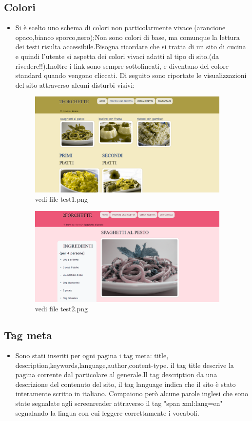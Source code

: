 \documentclass[12pt]{article}
\begin{document}
			\subsection{Colori}
			\begin{itemize}
				\item Si è scelto uno schema di colori non particolarmente vivace (arancione opaco,bianco sporco,nero);Non sono colori di base, ma comunque la lettura dei testi risulta accessibile.Bisogna ricordare che si tratta di un sito di cucina e quindi l'utente si aspetta dei colori vivaci adatti al tipo di sito.(da rivedere!!).Inoltre i link sono sempre sottolineati, e diventano del colore standard quando vengono cliccati.
				Di seguito sono riportate le visualizzazioni del sito attraverso alcuni disturbi visivi:
				
			
			\begin{figure}[ht!]
				\centering
				\includegraphics[width=100mm]{test1}
				\caption{vedi file test1.png}
			\end{figure}

				\begin{figure}[ht!]
					\centering
					\includegraphics[width=100mm]{test2}
					\caption{vedi file test2.png}
				\end{figure}
			\end{itemize}
			\subsection{Tag meta}
			\begin{itemize}
				\item Sono stati inseriti per ogni pagina i tag meta: title, description,keywords,language,author,content-type.
				il tag title descrive la pagina corrente dal particolare al generale.Il tag description da una descrizione del contenuto del sito, il tag language indica che il sito è stato interamente scritto in italiano. Compaiono però alcune parole inglesi che sono state segnalate agli screenreader attraverso il tag "span xml:lang=en" segnalando la lingua con cui leggere correttamente i vocaboli. 
			\end{itemize}
\end{document}
